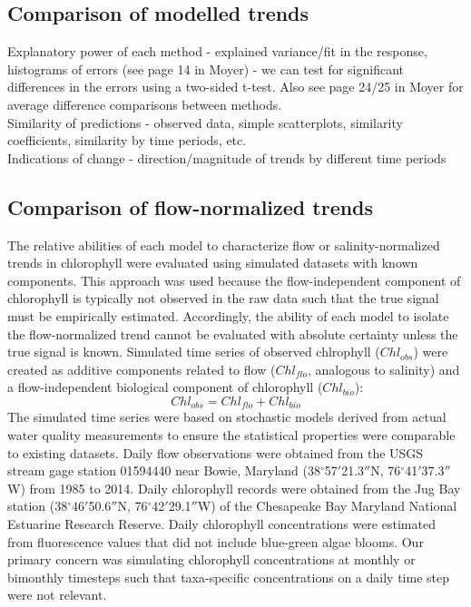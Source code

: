 \documentclass[letterpaper,12pt,oneside]{article}\usepackage[]{graphicx}\usepackage[]{color}
\begin{document}
\subsection{Comparison of modelled trends}

Explanatory power of each method - explained variance/fit in the response, histograms of errors (see page 14 in Moyer) - we can test for significant differences in the errors using a two-sided t-test.  Also see page 24/25 in Moyer for average difference comparisons between methods. \\
Similarity of predictions - observed data, simple scatterplots, similarity coefficients, similarity by time periods, etc.\\
Indications of change - direction/magnitude of trends by different time periods

\subsection{Comparison of flow-normalized trends}

The relative abilities of each model to characterize flow or salinity-normalized trends in chlorophyll were evaluated using simulated datasets with known components.  This approach was used because the flow-independent component of chlorophyll is typically not observed in the raw data such that the true signal must be empirically estimated.  Accordingly, the ability of each model to isolate the flow-normalized trend cannot be evaluated with absolute certainty unless the true signal is known.  Simulated time series of observed chlrophyll ($Chl_{obs}$) were created as additive components related to flow ($Chl_{flo}$, analogous to salinity) and a flow-independent biological component of chlorophyll ($Chl_{bio}$):
\begin{equation} \label{chlsim}
Chl_{obs} = Chl_{flo} + Chl_{bio}
\end{equation}
The simulated time series were based on stochastic models derived from actual water quality measurements to ensure the statistical properties were comparable to existing datasets.  Daily flow observations were obtained from the \ac{USGS} stream gage station 01594440 near Bowie, Maryland (38$^{\circ}$57$'$21.3$''$N, 76$^{\circ}$41$'$37.3$''$W) from 1985 to 2014.  Daily chlorophyll records were obtained from the Jug Bay station (38$^{\circ}$46$'$50.6$''$N, 76$^{\circ}$42$'$29.1$''$W) of the Chesapeake Bay Maryland National Estuarine Research Reserve.  Daily chlorophyll concentrations were estimated from fluorescence values that did not include blue-green algae blooms.  Our primary concern was simulating chlorophyll concentrations at monthly or bimonthly timesteps such that taxa-specific concentrations on a daily time step were not relevant.
\end{document}
